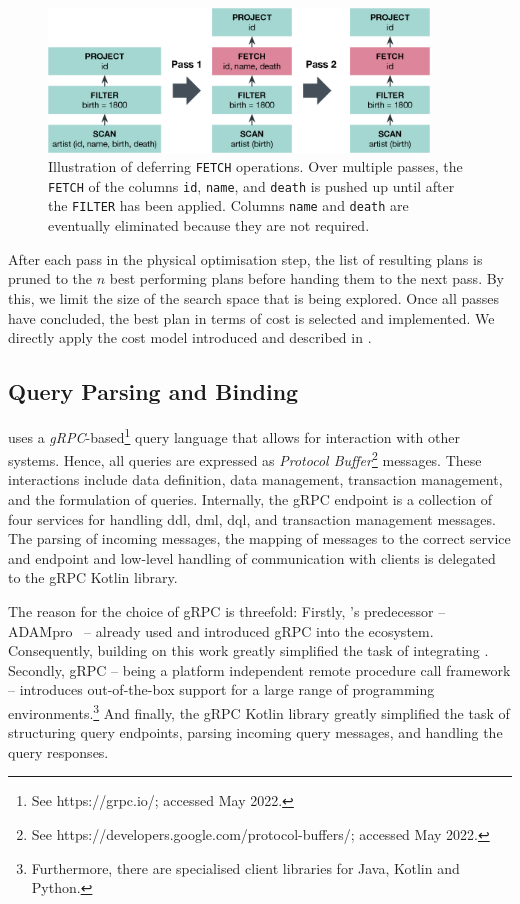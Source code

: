 \begin{figure}[bt]
    \centering
    \includegraphics[width=0.9\textwidth]{figures/physical-rule-fetch}
    \caption{Illustration of deferring \texttt{FETCH} operations. Over multiple passes, the \texttt{FETCH} of the columns \texttt{id}, \texttt{name}, and \texttt{death} is pushed up until after the \texttt{FILTER} has been applied. Columns \texttt{name} and \texttt{death} are eventually eliminated because they are not required.}
    \label{figure:cottontail_physical_rule_fetch}
\end{figure}

After each pass in the physical optimisation step, the list of resulting plans is pruned to the $n$ best performing plans before handing them to the next pass. By this, we limit the size of the search space that is being explored. Once all passes have concluded, the best plan in terms of cost is selected and implemented. We directly apply the cost model introduced and described in .

\subsection{Query Parsing and Binding}
\cottontail{} uses a \emph{gRPC}-based\footnote{See https://grpc.io/; accessed May 2022.} query language that allows for interaction with other systems. Hence, all queries are expressed as \emph{Protocol Buffer}\footnote{See https://developers.google.com/protocol-buffers/; accessed May 2022.} messages. These interactions include data definition, data management, transaction management, and the formulation of queries. Internally, the gRPC endpoint is a collection of four services for handling \acrshort{ddl}, \acrshort{dml}, \acrshort{dql}, and transaction management messages. The parsing of incoming messages, the mapping of messages to the correct service and endpoint and low-level handling of communication with clients is delegated to the gRPC Kotlin library. 

The reason for the choice of gRPC is threefold: Firstly, \cottontail{}'s predecessor -- ADAMpro~\cite{Giangreco:2016Adam} -- already used and introduced gRPC into the \vitrivr{} ecosystem. Consequently, building on this work greatly simplified the task of integrating \cottontail{}. Secondly, gRPC -- being a platform independent remote procedure call framework -- introduces out-of-the-box support for a large range of programming environments.\footnote{Furthermore, there are specialised client libraries for Java, Kotlin and Python.} And finally, the gRPC Kotlin library greatly simplified the task of structuring query endpoints, parsing incoming query messages, and handling the query responses.

